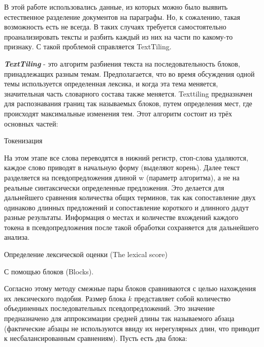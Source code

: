 \documentclass[12pt]{article}
\begin{document}
В этой работе использовались данные, из которых можно было выявить естественное разделение документов на параграфы. Но, к сожалению, такая возможность есть не всегда. В таких случаях требуется самостоятельно проанализировать тексты и разбить каждый из них на части по какому-то признаку. С такой проблемой справляется TextTiling.

\textbf{\textit{TextTiling}} - это алгоритм разбиения текста на последовательность блоков, принадлежащих разным темам. Предполагается, что во время обсуждения одной темы используется определенная лексика, и когда эта тема меняется, значительная часть словарного состава также меняется. Texttiling предназначен для распознавания границ так называемых блоков, путем определения мест, где происходят максимальные изменения тем.
Этот алгоритм состоит из трёх основных частей:
\par\begin{enumerate}{
		\vspace{0.2cm}\item Токенизация
		
		На этом этапе все слова переводятся в нижний регистр, стоп-слова удаляются, каждое слово приводят в начальную форму (выделяют корень). Далее текст разделяется на псевдопредложения длиной w (параметр алгоритма), а не на реальные синтаксически определенные предложения. Это делается для дальнейшего сравнения количества общих терминов, так как сопоставление двух одинаково длинных предложений и сопоставление короткого и длинного дадут разные результаты. Информация о местах и количестве вхождений каждого токена в псевдопредложения после такой обработки сохраняется для дальнейшего анализа.
		
		\vspace{0.2cm}\item Определение лексической оценки (The lexical score)
		
		\par\begin{itemize}{
				\item С помощью блоков (Blocks).
				
				Согласно этому методу смежные пары блоков сравниваются с целью нахождения их лексического подобия. Размер блока $k$ представляет собой количество объединенных последовательных псевдопредложений. Это значение предназначено для аппроксимации средней длины так называемого абзаца (фактические абзацы не используются ввиду их нерегулярных длин, что приводит к несбалансированным сравнениям). Пусть есть два блока:
				
}
\end{itemize}}
\end{enumerate}
\end{document}
